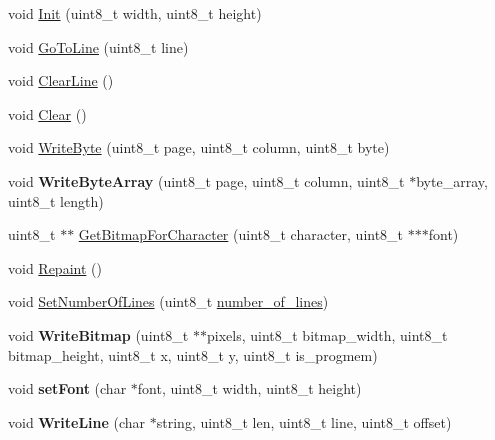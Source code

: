 \begin{DoxyCompactItemize}
\item 
void \hyperlink{class_o_l_e_d_a2c8205c8eac9d7a2b181657561e9b4d2}{Init} (uint8\+\_\+t width, uint8\+\_\+t height)
\item 
void \hyperlink{class_o_l_e_d_a8d314130676b104ed959b92ab4bac25e}{Go\+To\+Line} (uint8\+\_\+t line)
\item 
void \hyperlink{class_o_l_e_d_a3a571f5ea7a183fa14932cd5b2c423eb}{Clear\+Line} ()
\item 
void \hyperlink{class_o_l_e_d_a6c7bb1fc91b3e574a275f90643da140a}{Clear} ()
\item 
void \hyperlink{class_o_l_e_d_a7fa307269dbd2e80a6e48a1442df83d2}{Write\+Byte} (uint8\+\_\+t page, uint8\+\_\+t column, uint8\+\_\+t byte)
\item 
void {\bfseries Write\+Byte\+Array} (uint8\+\_\+t page, uint8\+\_\+t column, uint8\+\_\+t $\ast$byte\+\_\+array, uint8\+\_\+t length)\hypertarget{class_o_l_e_d_a7fffc17a5439300d361414c15a7a2dbe}{}\label{class_o_l_e_d_a7fffc17a5439300d361414c15a7a2dbe}

\item 
uint8\+\_\+t $\ast$$\ast$ \hyperlink{class_o_l_e_d_af2ec71160719b02aa985e9c95fdbb653}{Get\+Bitmap\+For\+Character} (uint8\+\_\+t character, uint8\+\_\+t $\ast$$\ast$$\ast$font)
\item 
void \hyperlink{class_o_l_e_d_a3efa34861b4ae0bc5323f6b7cf1d8a01}{Repaint} ()
\item 
void \hyperlink{class_o_l_e_d_aa3c88e19f05340036ea5ac9e2d1ea5dc}{Set\+Number\+Of\+Lines} (uint8\+\_\+t \hyperlink{class_o_l_e_d_a9ea1c55112deede1a61142af276a6bc9}{number\+\_\+of\+\_\+lines})
\item 
void {\bfseries Write\+Bitmap} (uint8\+\_\+t $\ast$$\ast$pixels, uint8\+\_\+t bitmap\+\_\+width, uint8\+\_\+t bitmap\+\_\+height, uint8\+\_\+t x, uint8\+\_\+t y, uint8\+\_\+t is\+\_\+progmem)\hypertarget{class_o_l_e_d_a541cf3d3db343ab33e4830b7dde05ca3}{}\label{class_o_l_e_d_a541cf3d3db343ab33e4830b7dde05ca3}

\item 
void {\bfseries set\+Font} (char $\ast$font, uint8\+\_\+t width, uint8\+\_\+t height)\hypertarget{class_o_l_e_d_a7620c3f21a1a26beba5b5a6bcac34a45}{}\label{class_o_l_e_d_a7620c3f21a1a26beba5b5a6bcac34a45}

\item 
void {\bfseries Write\+Line} (char $\ast$string, uint8\+\_\+t len, uint8\+\_\+t line, uint8\+\_\+t offset)\hypertarget{class_o_l_e_d_ae565a0831cb79bb7c8840170a50e006b}{}\label{class_o_l_e_d_ae565a0831cb79bb7c8840170a50e006b}

\end{DoxyCompactItemize}
